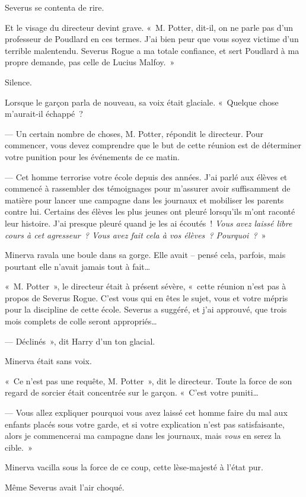 Severus se contenta de rire.

Et le visage du directeur devint grave.
«~M. Potter, dit-il, on ne parle pas d'un professeur de Poudlard en ces termes.
J'ai bien peur que vous soyez victime d'un terrible malentendu.
Severus Rogue a ma totale confiance, et sert Poudlard à ma propre demande, pas celle de Lucius Malfoy.~»

Silence.

Lorsque le garçon parla de nouveau, sa voix était glaciale.
«~Quelque chose m'aurait-il échappé~?

--- Un certain nombre de choses, M. Potter, répondit le directeur.
Pour commencer, vous devez comprendre que le but de cette réunion est de déterminer votre punition pour les événements de ce matin.

--- Cet homme terrorise votre école depuis des années.
J'ai parlé aux élèves et commencé à rassembler des témoignages pour m'assurer avoir suffisamment de matière pour lancer une campagne dans les journaux et mobiliser les parents contre lui.
Certains des élèves les plus jeunes ont pleuré lorsqu'ils m'ont raconté leur histoire.
J'ai presque pleuré quand je les ai écoutés~!
\emph{Vous avez laissé libre cours à cet agresseur~?
Vous avez fait cela à vos élèves~?
Pourquoi~?}~»

Minerva ravala une boule dans sa gorge.
Elle avait -- pensé cela, parfois, mais pourtant elle n'avait jamais tout à fait…

«~M. Potter~», le directeur était à présent sévère, «~cette réunion n'est pas à propos de Severus Rogue.
C'est vous qui en êtes le sujet, vous et votre mépris pour la discipline de cette école.
Severus a suggéré, et j'ai approuvé, que trois mois complets de colle seront appropriés…

--- Déclinés~», dit Harry d'un ton glacial.

Minerva était sans voix.

«~Ce n'est pas une requête, M. Potter~», dit le directeur.
Toute la force de son regard de sorcier était concentrée sur le garçon.
«~C'est votre puniti…

--- Vous allez expliquer pourquoi vous avez laissé cet homme faire du mal aux enfants placés sous votre garde, et si votre explication n'est pas satisfaisante, alors je commencerai ma campagne dans les journaux, mais \emph{vous} en serez la cible.~»

Minerva vacilla sous la force de ce coup, cette lèse-majesté à l'état pur.

Même Severus avait l'air choqué.

